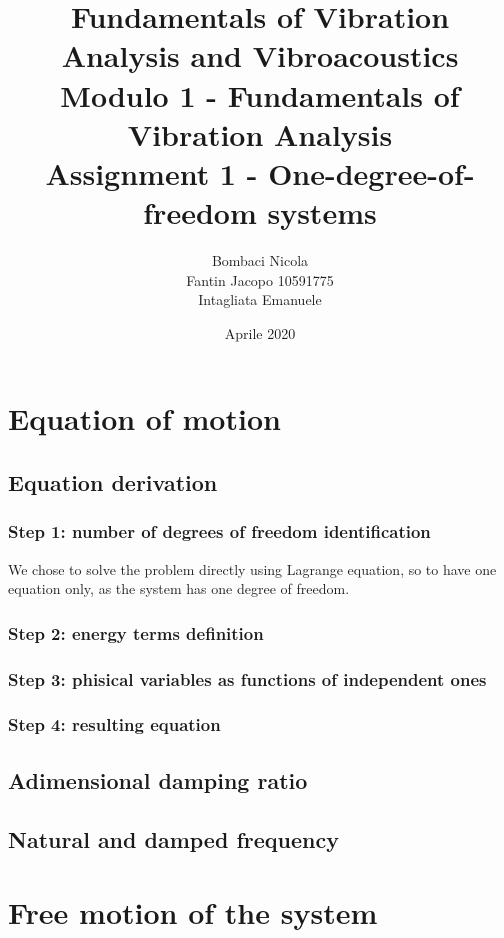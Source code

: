 \documentclass[a4paper,12pt,oneside]{article}
\title{Fundamentals of Vibration Analysis and Vibroacoustics \\
Modulo 1 - Fundamentals of Vibration Analysis \\
Assignment 1 - One-degree-of-freedom systems}
\author{Bombaci Nicola \\
Fantin Jacopo 10591775 \\
Intagliata Emanuele}
\date{Aprile 2020}
\begin{document}
\maketitle

\section{Equation of motion}

\subsection{Equation derivation}

\subsubsection*{Step 1: number of degrees of freedom identification}

We chose to solve the problem directly using Lagrange equation, so to have one equation only, as the system has one degree of freedom.

\subsubsection*{Step 2: energy terms definition}



\subsubsection*{Step 3: phisical variables as functions of independent ones}



\subsubsection*{Step 4: resulting equation}



\subsection{Adimensional damping ratio}



\subsection{Natural and damped frequency}



\section{Free motion of the system}
\end{document}
